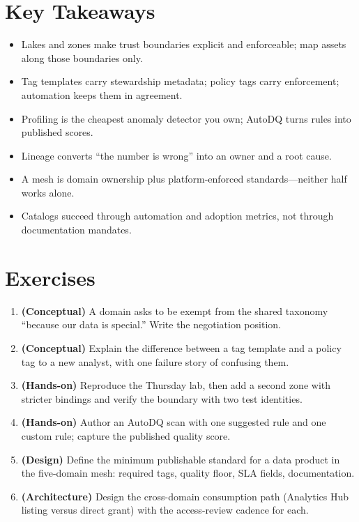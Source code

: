 \section*{Key Takeaways}
\begin{itemize}
    \item Lakes and zones make trust boundaries explicit and enforceable; map assets along those boundaries only.
    \item Tag templates carry stewardship metadata; policy tags carry enforcement; automation keeps them in agreement.
    \item Profiling is the cheapest anomaly detector you own; AutoDQ turns rules into published scores.
    \item Lineage converts ``the number is wrong'' into an owner and a root cause.
    \item A mesh is domain ownership plus platform-enforced standards---neither half works alone.
    \item Catalogs succeed through automation and adoption metrics, not through documentation mandates.
\end{itemize}

\section{Exercises}
\begin{enumerate}
    \item \textbf{(Conceptual)} A domain asks to be exempt from the shared taxonomy ``because our data is special.'' Write the negotiation position.
    \item \textbf{(Conceptual)} Explain the difference between a tag template and a policy tag to a new analyst, with one failure story of confusing them.
    \item \textbf{(Hands-on)} Reproduce the Thursday lab, then add a second zone with stricter bindings and verify the boundary with two test identities.
    \item \textbf{(Hands-on)} Author an AutoDQ scan with one suggested rule and one custom rule; capture the published quality score.
    \item \textbf{(Design)} Define the minimum publishable standard for a data product in the five-domain mesh: required tags, quality floor, SLA fields, documentation.
    \item \textbf{(Architecture)} Design the cross-domain consumption path (Analytics Hub listing versus direct grant) with the access-review cadence for each.
\end{enumerate}
